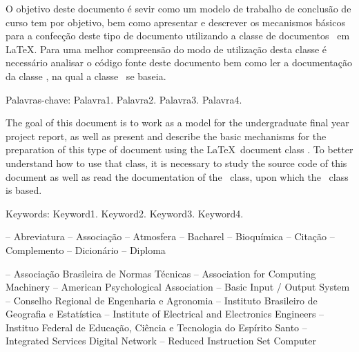 \documentclass[times,english,brazilian,oneside,section=TITLE]{ifes8}
\begin{document}
\begin{resumo}
  O objetivo deste documento é sevir como um modelo de trabalho de
  conclusão de curso tem por objetivo, bem como apresentar e descrever
  os mecanismos básicos para a confecção deste tipo de documento
  utilizando a classe de documentos \ifestex\ em \LaTeX.
  Para uma melhor compreensão do modo de utilização desta classe é
  necessário analisar o código fonte deste documento bem como ler a
  documentação da classe \abnTeX, na qual a classe \ifestex\ se
  baseia.

  Palavras-chave: Palavra1. Palavra2. Palavra3. Palavra4.
\end{resumo}

\begin{resumo}[Abstract]
  \begin{otherlanguage}{english}
    The goal of this document is to work as a model for the
    undergraduate final year project report, as well as present and
    describe the basic mechanisms for the preparation of this type of
    document using the \LaTeX\ document class \ifestex.
    To better understand how to use that class, it is necessary to
    study the source code of this document as well as read the
    documentation of the \abnTeX\ class, upon which the \ifestex\
    class is based.

    Keywords: Keyword1. Keyword2. Keyword3. Keyword4.
  \end{otherlanguage}
\end{resumo}


\renewcommand{\listfigurename}{Lista de figuras}
\pdfbookmark[0]{\listfigurename}{lof}
\listoffigures*
\cleardoublepage


\listoftables*
\cleardoublepage


\listadequadros*
\cleardoublepage


\begin{abreviaturas}
   -- Abreviatura
   -- Associação
   -- Atmosfera
   -- Bacharel
   -- Bioquímica
   -- Citação
   -- Complemento
   -- Dicionário
   -- Diploma
\end{abreviaturas}


\begin{siglas}
   -- Associação Brasileira de Normas Técnicas
   -- Association for Computing Machinery
   -- American Psychological Association
   -- Basic Input / Output System
   -- Conselho Regional de Engenharia e Agronomia
   -- Instituto Brasileiro de Geografia e Estatística
  \simb{IEEE} -- Institute of Electrical and Electronics Engineers
  \simb{Ifes} -- Instituo Federal de Educação, Ciência e Tecnologia do Espírito Santo
  \simb{ISDN} -- Integrated Services Digital Network
   -- Reduced Instruction Set Computer
\end{siglas}
\end{document}
